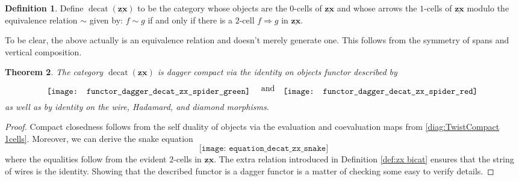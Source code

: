 \documentclass[11pt]{amsart}
\DeclareMathOperator{\decat}{decat}
\newtheorem{thm}{Theorem}[section]
\theoremstyle{remark}
\theoremstyle{definition}
\newtheorem{defn}[thm]{Definition}
\newcommand{\bicat}[1]{\underline{\mathbf{#1}}}
\begin{document}
\begin{defn}
\label{def:decat zx}
	Define $\decat(\bicat{zx})$ to be the category whose objects are the $0$-cells of $\bicat{zx}$ and whose arrows the $1$-cells of $\bicat{zx}$ modulo the equivalence relation $\sim$ given by: $f \sim g$ if and only if there is a $2$-cell $f \Rightarrow g$ in $\bicat{zx}$.
\end{defn}

To be clear, the above actually is an equivalence relation and doesn't merely generate one.  This follows from the symmetry of spans and vertical composition.   

\begin{thm}
\label{thm:decat zx is dagger compact}
	The category $\decat(\bicat{zx})$ is dagger compact via the identity on objects functor described by 
	\[
	\raisebox{-0.5\height}{%
	\texttt{[image: functor\_dagger\_decat\_zx\_spider\_green]}
	}
	\quad \text{and} \quad
	\raisebox{-0.5\height}{%
	\texttt{[image: functor\_dagger\_decat\_zx\_spider\_red]}
	}
	\]
	as well as by identity on the wire, Hadamard, and diamond morphisms.
\end{thm}
\begin{proof}
	Compact closedness follows from the self duality of objects via the evaluation and coevaluation maps from \eqref{diag:TwistCompact 1cells}. Moreover, we can derive the snake equation
	\[
		\texttt{[image: equation\_decat\_zx\_snake]}
	\]
	where the equalities follow from the evident $2$-cells in $\bicat{zx}$. The extra relation introduced in Definition \ref{def:zx bicat} ensures that the string of wires is the identity.  Showing that the described functor is a dagger functor is a matter of checking some easy to verify details. 
\end{proof}
\end{document}
